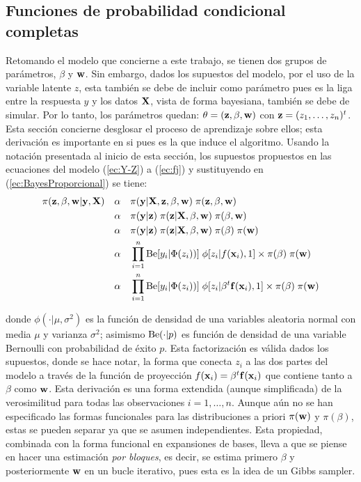 \documentclass[../Main/Main.tex]{subfiles}
\begin{document}

\subsection{Funciones de probabilidad condicional completas}
Retomando el modelo que concierne a este trabajo, se tienen dos grupos de parámetros, $\beta$ y $\mathbf{w}$. Sin embargo, dados los supuestos del modelo, por el uso de la variable latente $z$, esta también se debe de incluir como parámetro pues es la liga entre la respuesta $y$ y los datos $\mathbf{X}$, vista de forma bayesiana, también se debe de simular. Por lo tanto, los parámetros quedan: $\theta = (\mathbf{z}, \beta, \mathbf{w})$ con $\mathbf{z} = (z_1,\ldots,z_n)^t$. Esta sección concierne desglosar  el proceso de aprendizaje sobre ellos; esta derivación es importante en si pues es la que induce el algoritmo. Usando la notación presentada al inicio de esta sección, los supuestos propuestos en las ecuaciones del modelo (\ref{ec:Y-Z}) a (\ref{ec:fj}) y sustituyendo en (\ref{ec:BayesProporcional}) se tiene:
\begin{align} 
	\pi(\mathbf{z}, \beta , \mathbf{w} | \mathbf{y}, \mathbf{X}) \quad 
	& \alpha \quad \pi(\mathbf{y} | \mathbf{X}, \mathbf{z}, \beta, \mathbf{w}) 
		\; \pi(\mathbf{z}, \beta, \mathbf{w}) \nonumber\\
	& \alpha \quad \pi(\mathbf{y} |\mathbf{z}) \; \pi(\mathbf{z}|\mathbf{X},\beta,\mathbf{w}) 				\; \pi(\beta,\mathbf{w}) \nonumber\\  
	& \alpha \quad \pi(\mathbf{y} |\mathbf{z}) \; \pi(\mathbf{z}|\mathbf{X},\beta,\mathbf{w}) 				\; \pi(\beta) \; \pi(\mathbf{w}) \nonumber\\ 
	& \alpha \quad \prod_{i = 1}^n\text{Be}[y_i | \Phi(z_i))] 
	\; \phi[z_i | f(\mathbf{x}_i), 1] \times  \pi(\beta) \; \pi(\mathbf{w}) \nonumber\\ 
	& \alpha \quad \prod_{i = 1}^n\text{Be}[y_i | \Phi(z_i))] 
	\; \phi[z_i | \beta^t\mathbf{f}(\mathbf{x}_i), 1] \times  \pi(\beta) \; \pi(\mathbf{w}) \label{ec:BayesMod}
\end{align}

donde $\phi(\cdot|\mu, \sigma^2)$ es la función de densidad de una variables aleatoria normal con media $\mu$ y varianza $\sigma^2$; asimismo $\text{Be}(\cdot|p)$ es función de densidad de una variable Bernoulli con probabilidad de éxito $p$. Esta factorización es válida dados los supuestos, donde se hace notar, la forma que conecta $z_i$ a las dos partes del modelo a través de la función de proyección $f(\mathbf{x}_i) = \beta^t\mathbf{f}(\mathbf{x}_i)$ que contiene tanto a $\beta$ como $\mathbf{w}$. Esta derivación es una forma extendida (aunque simplificada) de la verosimilitud para todas las observaciones $i = 1,\ldots,n$. Aunque aún no se han especificado las formas funcionales para las distribuciones a priori $\pi(\mathbf{w})$ y $\pi(\beta)$, estas se pueden separar ya que se asumen independientes.  Esta propiedad, combinada con la forma funcional en expansiones de bases, lleva a que se piense en hacer una estimación \textit{por bloques}, es decir, se estima primero $\beta$ y posteriormente $\mathbf{w}$ en un bucle iterativo, pues esta es la idea de un Gibbs sampler. 
\end{document}

